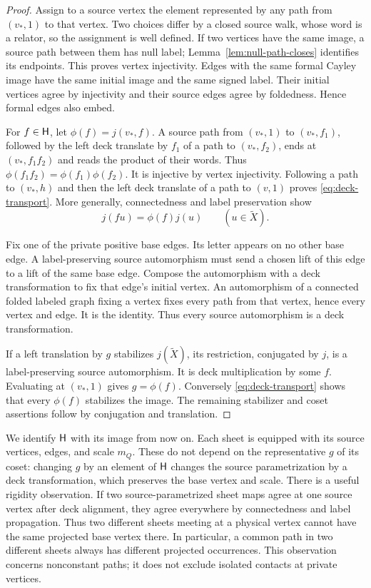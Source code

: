 \begin{proof}
Assign to a source vertex the element represented by any path from
$(v_*,1)$ to that vertex.  Two choices differ by a closed source walk,
whose word is a relator, so the assignment is well defined.  If two
vertices have the same image, a source path between them has null label;
Lemma~\ref{lem:null-path-closes} identifies its endpoints.  This proves
vertex injectivity.  Edges with the same formal Cayley image have the
same initial image and the same signed label.  Their initial vertices
agree by injectivity and their source edges agree by foldedness.  Hence
formal edges also embed.

For $f\in\mathsf H$, let $\phi(f)=j(v_*,f)$.  A source path from $(v_*,1)$
to $(v_*,f_1)$, followed by the left deck translate by $f_1$ of a path
to $(v_*,f_2)$, ends at $(v_*,f_1f_2)$ and reads the product of their
words.  Thus $\phi(f_1f_2)=\phi(f_1)\phi(f_2)$.  It is injective by
vertex injectivity.  Following a path to $(v_*,h)$ and then the left deck
translate of a path to $(v,1)$ proves \eqref{eq:deck-transport}.
More generally, connectedness and label preservation show
\[
 j(fu)=\phi(f)j(u)\qquad(u\in\widetilde X).
\]

Fix one of the private positive base edges.  Its letter appears on no
other base edge.  A label-preserving source automorphism must send a
chosen lift of this edge to a lift of the same base edge.  Compose the
automorphism with a deck transformation to fix that edge's initial
vertex.  An automorphism of a connected folded labeled graph fixing a
vertex fixes every path from that vertex, hence every vertex and edge.
It is the identity.  Thus every source automorphism is a deck
transformation.

If a left translation by $g$ stabilizes $j(\widetilde X)$, its
restriction, conjugated by $j$, is a label-preserving source
automorphism.  It is deck multiplication by some $f$.  Evaluating at
$(v_*,1)$ gives $g=\phi(f)$.  Conversely \eqref{eq:deck-transport} shows
that every $\phi(f)$ stabilizes the image.  The remaining stabilizer and
coset assertions follow by conjugation and translation.
\end{proof}

We identify $\mathsf H$ with its image from now on.  Each sheet is equipped
with its source vertices, edges, and scale $m_Q$.  These do not depend on
the representative $g$ of its coset: changing $g$ by an element of $\mathsf H$
changes the source parametrization by a deck transformation, which
preserves the base vertex and scale.  There is a useful rigidity
observation.  If two source-parametrized sheet maps agree at one source
vertex after deck alignment, they agree everywhere by connectedness and
label propagation.  Thus two different sheets meeting at a physical
vertex cannot have the same projected base vertex there.  In particular,
a common path in two different sheets always has different projected
occurrences.  This observation concerns nonconstant paths; it does not
exclude isolated contacts at private vertices.

